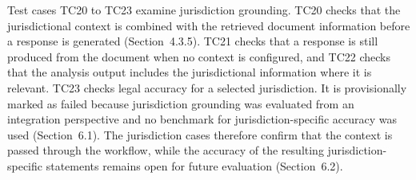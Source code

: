 \documentclass[12pt,a4paper,oneside]{report}
\begin{document}
Test cases TC20 to TC23 examine jurisdiction grounding. TC20 checks that the jurisdictional context is combined with the retrieved document information before a response is generated (Section~4.3.5). TC21 checks that a response is still produced from the document when no context is configured, and TC22 checks that the analysis output includes the jurisdictional information where it is relevant. TC23 checks legal accuracy for a selected jurisdiction. It is provisionally marked as failed because jurisdiction grounding was evaluated from an integration perspective and no benchmark for jurisdiction-specific accuracy was used (Section~6.1). The jurisdiction cases therefore confirm that the context is passed through the workflow, while the accuracy of the resulting jurisdiction-specific statements remains open for future evaluation (Section~6.2).
\end{document}
